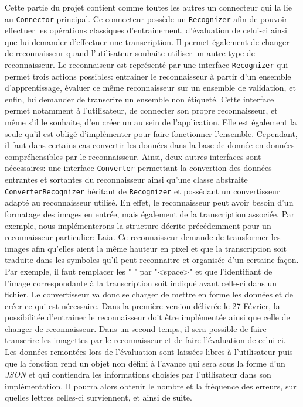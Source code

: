 Cette partie du projet contient comme toutes les autres un connecteur qui la lie au \texttt{Connector} principal. Ce connecteur possède un \texttt{Recognizer} afin de pouvoir effectuer les opérations classiques d'entrainement, d'évaluation de celui-ci ainsi que lui demander d'effectuer une transcription. Il permet également de changer de reconnaisseur quand l'utilisateur souhaite utiliser un autre type de reconnaisseur.
\newline{}
Le reconnaiseur est représenté par une interface \texttt{Recognizer} qui permet trois actions possibles: entrainer le reconnaisseur à partir d'un ensemble d'apprentissage, évaluer ce même reconnaisseur sur un ensemble de validation, et enfin, lui demander de transcrire un ensemble non étiqueté.
Cette interface permet notamment à l'utilisateur, de connecter son propre reconnaisseur, et même s'il le souhaite, d'en créer un au sein de l'application. Elle est également la seule qu'il est obligé d'implémenter pour faire fonctionner l'ensemble. Cependant, il faut dans certains cas convertir les données dans la base de donnée en données compréhensibles par le reconnaisseur. Ainsi, deux autres interfaces sont nécessaires: une interface \texttt{Converter} permettant la convertion des données entrantes et sortantes du reconnaisseur ainsi qu'une classe abstraite \texttt{ConverterRecognizer} héritant de \texttt{Recognizer} et possédant un convertisseur adapté au reconnaisseur utilisé. En effet, le reconnaisseur peut avoir besoin d'un formatage des images en entrée, mais également de la transcription associée. Par exemple, nous implémenterons la structure décrite précédemment pour un reconnaisseur particulier: \href{https://github.com/jpuigcerver/Laia/tree/master/egs/iam}{Laia}. Ce reconnaisseur demande de transformer les images afin qu'elles aient la même hauteur en pixel et que la transcription soit traduite dans les symboles qu'il peut reconnaitre et organisée d'un certaine façon. Par exemple, il faut remplacer les  " " par "<space>" et que l'identifiant de l'image correspondante à la transcription soit indiqué avant celle-ci dans un fichier. Le convertisseur va donc se charger de mettre en forme les données et de créer ce qui est nécessaire.
\newline{}
Dans la première version délivrée le 27 Février, la possibilitée d'entrainer le reconnaisseur doit être implémentée ainsi que celle de changer de reconnaisseur. Dans un second temps, il sera possible de faire transcrire les imagettes par le reconnaisseur et de faire l'évaluation de celui-ci. Les données remontées lors de l'évaluation sont laissées libres à l'utilisateur puis que la fonction rend un objet non défini à l'avance qui sera sous la forme d'un \textit{JSON} et qui contiendra les informations choisies par l'utilisateur dans son implémentation. Il pourra alors obtenir le nombre et la fréquence des erreurs, sur quelles lettres celles-ci surviennent, et ainsi de suite.

